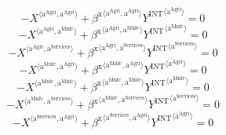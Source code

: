 \begin{equation}
-{X}^{\langle \mathrm{a}^{\mathrm{Agri}},\mathrm{a}^{\mathrm{Agri}}\rangle} + {{\beta^{\mathrm{x}}}^{\langle \mathrm{\mathrm{a}^{\mathrm{Agri}}},\mathrm{\mathrm{a}^{\mathrm{Agri}}}\rangle}} {{Y^{\mathrm{INT}}}^{\langle \mathrm{a}^{\mathrm{Agri}}\rangle}} = 0
\end{equation}
\begin{equation}
-{X}^{\langle \mathrm{a}^{\mathrm{Agri}},\mathrm{a}^{\mathrm{Mnfc}}\rangle} + {{\beta^{\mathrm{x}}}^{\langle \mathrm{\mathrm{a}^{\mathrm{Agri}}},\mathrm{\mathrm{a}^{\mathrm{Mnfc}}}\rangle}} {{Y^{\mathrm{INT}}}^{\langle \mathrm{a}^{\mathrm{Mnfc}}\rangle}} = 0
\end{equation}
\begin{equation}
-{X}^{\langle \mathrm{a}^{\mathrm{Agri}},\mathrm{a}^{\mathrm{Services}}\rangle} + {{\beta^{\mathrm{x}}}^{\langle \mathrm{\mathrm{a}^{\mathrm{Agri}}},\mathrm{\mathrm{a}^{\mathrm{Services}}}\rangle}} {{Y^{\mathrm{INT}}}^{\langle \mathrm{a}^{\mathrm{Services}}\rangle}} = 0
\end{equation}
\begin{equation}
-{X}^{\langle \mathrm{a}^{\mathrm{Mnfc}},\mathrm{a}^{\mathrm{Agri}}\rangle} + {{\beta^{\mathrm{x}}}^{\langle \mathrm{\mathrm{a}^{\mathrm{Mnfc}}},\mathrm{\mathrm{a}^{\mathrm{Agri}}}\rangle}} {{Y^{\mathrm{INT}}}^{\langle \mathrm{a}^{\mathrm{Agri}}\rangle}} = 0
\end{equation}
\begin{equation}
-{X}^{\langle \mathrm{a}^{\mathrm{Mnfc}},\mathrm{a}^{\mathrm{Mnfc}}\rangle} + {{\beta^{\mathrm{x}}}^{\langle \mathrm{\mathrm{a}^{\mathrm{Mnfc}}},\mathrm{\mathrm{a}^{\mathrm{Mnfc}}}\rangle}} {{Y^{\mathrm{INT}}}^{\langle \mathrm{a}^{\mathrm{Mnfc}}\rangle}} = 0
\end{equation}
\begin{equation}
-{X}^{\langle \mathrm{a}^{\mathrm{Mnfc}},\mathrm{a}^{\mathrm{Services}}\rangle} + {{\beta^{\mathrm{x}}}^{\langle \mathrm{\mathrm{a}^{\mathrm{Mnfc}}},\mathrm{\mathrm{a}^{\mathrm{Services}}}\rangle}} {{Y^{\mathrm{INT}}}^{\langle \mathrm{a}^{\mathrm{Services}}\rangle}} = 0
\end{equation}
\begin{equation}
-{X}^{\langle \mathrm{a}^{\mathrm{Services}},\mathrm{a}^{\mathrm{Agri}}\rangle} + {{\beta^{\mathrm{x}}}^{\langle \mathrm{\mathrm{a}^{\mathrm{Services}}},\mathrm{\mathrm{a}^{\mathrm{Agri}}}\rangle}} {{Y^{\mathrm{INT}}}^{\langle \mathrm{a}^{\mathrm{Agri}}\rangle}} = 0
\end{equation}
